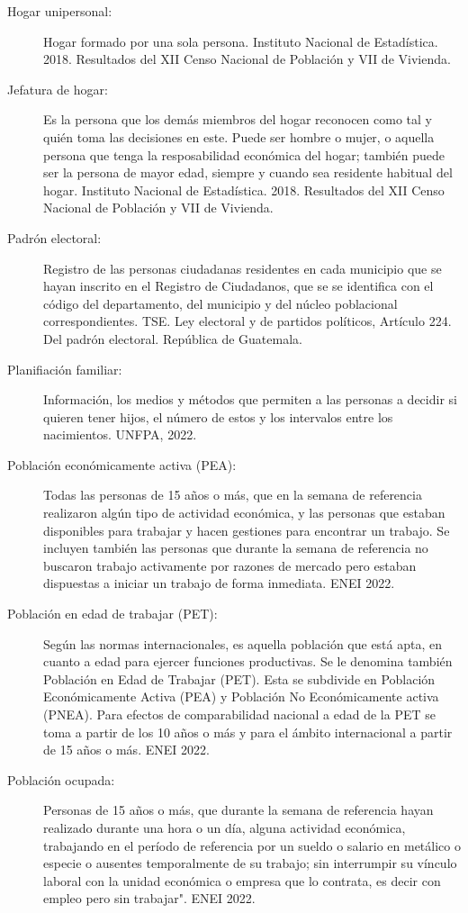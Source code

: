 \begin{description}
	\item[Hogar unipersonal:] Hogar formado por una sola persona. Instituto Nacional de Estadística. 2018. Resultados del XII Censo Nacional de Población y VII de Vivienda. 
	\item[Jefatura de hogar:] Es la persona que los demás miembros del hogar reconocen como tal y quién toma las decisiones en este. Puede ser hombre o mujer, o aquella persona que tenga la resposabilidad económica del hogar; también puede ser la persona de mayor edad, siempre y cuando sea residente habitual del hogar. Instituto Nacional de Estadística. 2018. Resultados del XII Censo Nacional de Población y VII de Vivienda.
	\item[Padrón electoral:] Registro de las personas ciudadanas residentes en cada municipio que se hayan inscrito en el Registro de Ciudadanos, que se se identifica con el código del departamento, del municipio y del núcleo poblacional correspondientes. TSE. Ley electoral y de partidos políticos, Artículo 224. Del padrón electoral. República de Guatemala.
	\item[Planifiación familiar:] Información, los medios y métodos que permiten a las personas a decidir si quieren tener hijos, el número de estos y los intervalos entre los nacimientos. UNFPA, 2022. 
	\item[Población económicamente activa (PEA):] Todas las personas de 15 años o más, que en la semana de referencia realizaron algún tipo de actividad económica, y las personas que estaban disponibles para trabajar y hacen gestiones para encontrar un trabajo. Se incluyen también las personas que durante la semana de referencia no buscaron trabajo activamente por razones de mercado pero estaban dispuestas a iniciar un trabajo de forma inmediata. ENEI 2022.
	\item[Población en edad de trabajar (PET):] Según las normas internacionales, es aquella población que está apta, en cuanto a edad para ejercer funciones productivas. Se le denomina también Población en Edad de Trabajar (PET). Esta se subdivide en Población Económicamente Activa (PEA) y Población No Económicamente activa (PNEA). Para efectos de comparabilidad nacional a edad de la PET se toma a partir de los 10 años o más y para el ámbito internacional a partir de 15 años o más. ENEI 2022.
	\item[Población ocupada:] Personas de 15 años o más, que durante la semana de referencia hayan realizado durante una hora o un día, alguna actividad económica, trabajando en el período de referencia por un sueldo o salario en metálico o especie o ausentes temporalmente de su trabajo; sin interrumpir su vínculo laboral con la unidad económica o empresa que lo contrata, es decir con empleo pero sin trabajar". ENEI 2022.

\end{description}
